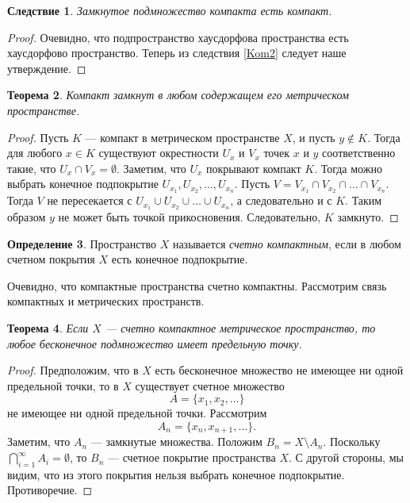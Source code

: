 \documentclass[12pt, titlepage, oneside]{amsbook}
\newtheorem{theorem}{Теорема}[chapter]
\newtheorem{corollary}[theorem]{Следствие}
\theoremstyle{definition}
\newtheorem{definition}[theorem]{Определение}
\theoremstyle{remark}
\begin{document}
\begin{corollary}
	\label{Kom3}
	Замкнутое подмножество компакта есть компакт.
\end{corollary}

\begin{proof}
	Очевидно, что подпространство хаусдорфова пространства есть хаусдорфово пространство. Теперь из следствия \ref{Kom2} следует наше утверждение.
\end{proof}

\begin{theorem}
	\label{Kom4}
	Компакт замкнут в любом содержащем его метрическом пространстве.
\end{theorem}

\begin{proof}
	Пусть $K$ --- компакт в метрическом пространстве $X$, и пусть $y\not\in K$. Тогда для любого $x\in K$ существуют окрестности $U_x$ и $V_x$ точек $x$ и $y$ соответственно такие, что $U_x\cap V_x=\emptyset$. Заметим, что $U_x$ покрывают компакт $K$. Тогда можно выбрать конечное подпокрытие $U_{x_1},U_{x_2},\ldots, U_{x_n}$. Пусть $V=V_{x_1}\cap V_{x_2}\cap\ldots\cap V_{x_n}$. Тогда $V$ не пересекается с $U_{x_1}\cup U_{x_2}\cup\ldots\cup U_{x_n}$, а следовательно и с $K$. Таким образом $y$ не может быть точкой прикосновения. Следовательно, $K$ замкнуто.
\end{proof}

\begin{definition}
	Пространство $X$ называется \emph{счетно компактным}, если в любом счетном покрытия $X$ есть конечное подпокрытие.
\end{definition}

Очевидно, что компактные пространства счетно компактны. Рассмотрим связь компактных и метрических пространств.

\begin{theorem}
	\label{Kom5}
	Если $X$ --- счетно компактное метрическое пространство, то любое бесконечное подмножество имеет предельную точку.
\end{theorem}

\begin{proof}
	Предположим, что в $X$ есть бесконечное множество не имеющее ни одной предельной точки, то в $X$ существует счетное множество $$A=\{x_1,x_2,\ldots\}$$ не имеющее ни одной предельной точки. Рассмотрим $$A_n=\{x_{n},x_{n+1},\ldots\}.$$ Заметим, что $A_n$ --- замкнутые множества. Положим $B_n=X\setminus A_n$. Поскольку $\bigcap\limits_{i=1}^{\infty} A_i=\emptyset$, то $B_n$ --- счетное покрытие пространства $X$. С другой стороны, мы видим, что из этого покрытия нельзя выбрать конечное подпокрытие. Противоречие.
\end{proof}
\end{document}
